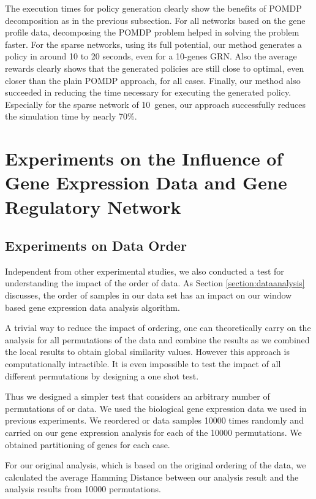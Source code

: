 The execution times for policy generation clearly show the benefits of POMDP decomposition as in the previous
subsection. For all networks based on the gene profile data, decomposing the POMDP problem helped in solving
the problem faster. For the sparse networks, using its full potential, our method generates a policy in
around 10 to 20 seconds, even for a 10-genes GRN. Also the average rewards clearly shows that the generated
policies are still close to optimal, even closer than the plain POMDP approach, for all cases. Finally, our
method also succeeded in reducing the time necessary for executing the generated policy. Especially for the
sparse network of 10~genes, our approach successfully reduces the simulation time by nearly 70\%.

\section{Experiments on the Influence of  Gene Expression Data and Gene Regulatory Network}
\subsection{Experiments on Data Order}
Independent from other experimental studies, we also conducted a test for understanding the impact of the order of data. As Section \ref{section:dataanalysis} discusses, the order of samples in our data set has an impact on our window based gene expression data analysis algorithm. 

A trivial way to reduce the impact of ordering, one can theoretically carry on the analysis for all permutations of the data and combine the results as we combined the local results to obtain global similarity values. However this approach is computationally intractible. It is even impossible to test the impact of all different permutations by designing a one shot test. 

Thus we designed a simpler test that considers an arbitrary number of permutations of or data. We used the biological gene expression data we used in previous experiments. We reordered or data samples 10000 times randomly and carried on our gene expression analysis for each of the 10000 permutations. We obtained partitioning of genes for each case.

For our original analysis, which is based on the original ordering of the data, we calculated the average Hamming Distance between our analysis result and the analysis results from 10000 permutations. 

